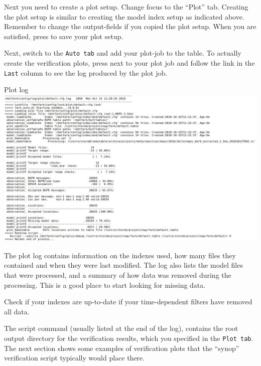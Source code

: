 \documentclass[letterpaper,10pt,twoside,twocolumn,openany]{book}
\begin{document}
{Next you need to create a plot setup. Change focus to the ``Plot'' tab. 
Creating the plot setup is similar to creating the model index setup as indicated above. Remember to change the output-fields if you copied the plot setup.
When you are satisfied, press  to save your plot setup.

Next, switch to the \lstinline!Auto tab! and add your plot-job to the table.
To actually create the verification plots, press  next to your plot job and follow the link in the \lstinline!Last! column to see the log produced by the plot job.
\begin{paperbox}{Plot log}
  \includegraphics[width=\columnwidth]{plotlog.jpg}
\end{paperbox}

The plot log contains information on the indexes used, how many files they contained and when they were last modified.
The log also lists the model files that were processed, and a summary of how data was removed during the processing. This is a good place to start looking for missing data.
\begin{quotebox}
  Check if your indexes are up-to-date if your time-dependent filters have removed all data.
\end{quotebox}

The script command (usually listed at the end of the log), contains the root output directory for the verification results, which you specified in the \lstinline!Plot tab!. The next section shows some examples of verification plots that the ``synop'' verification script typically would place there.

}
\end{document}
